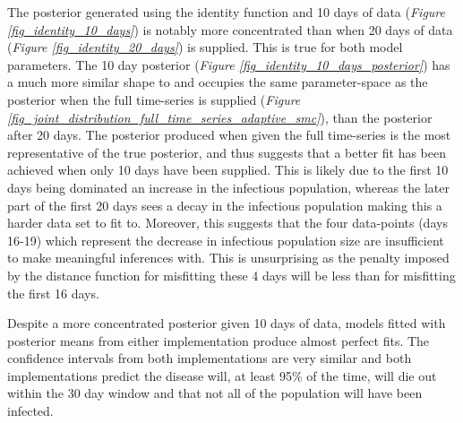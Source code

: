 \documentclass[11pt,a4paper]{article}
\theoremstyle{break}
\begin{document}
  \par The posterior generated using the identity function and 10 days of data (\textit{Figure \ref{fig_identity_10_days}}) is notably more concentrated than when 20 days of data (\textit{Figure \ref{fig_identity_20_days}}) is supplied. This is true for both model parameters. The 10 day posterior (\textit{Figure \ref{fig_identity_10_days_posterior}}) has a much more similar shape to and occupies the same parameter-space as the posterior when the full time-series is supplied (\textit{Figure \ref{fig_joint_distribution_full_time_series_adaptive_smc}}), than the posterior after 20 days. The posterior produced when given the full time-series is the most representative of the true posterior, and thus suggests that a better fit has been achieved when only 10 days have been supplied. This is likely due to the first 10 days being dominated an increase in the infectious population, whereas the later part of the first 20 days sees a decay in the infectious population making this a harder data set to fit to. Moreover, this suggests that the four data-points (days 16-19) which represent the decrease in infectious population size are insufficient to make meaningful inferences with. This is unsurprising as the penalty imposed by the distance function for misfitting these 4 days will be less than for misfitting the first 16 days.

  \par Despite a more concentrated posterior given 10 days of data, models fitted with posterior means from either implementation produce almost perfect fits. The confidence intervals from both implementations are very similar and both implementations predict the disease will, at least 95\% of the time, will die out within the 30 day window and that not all of the population will have been infected.
\end{document}
